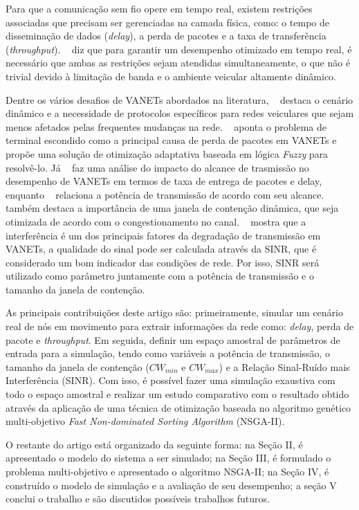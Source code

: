 \documentclass[conference]{IEEEtran}
\begin{document}
Para que a comunicação sem fio opere em tempo real, existem restrições associadas que precisam ser gerenciadas na camada física, como: o tempo de disseminação de dados (\textit{delay}), a perda de pacotes e a taxa de transferência (\textit{throughput}). ~\cite{Dai:2016} diz que para garantir um desempenho otimizado em tempo real, é necessário que ambas as restrições sejam atendidas simultaneamente, o que não é trivial devido à limitação de banda e o ambiente veicular altamente dinâmico.

Dentre os vários desafios de VANETs abordados na literatura, ~\cite{Cunha:2017} destaca o cenário dinâmico e a necessidade de protocolos específicos para redes veiculares que sejam menos afetados pelas frequentes mudanças na rede. ~\cite{Lim:2015} aponta o problema de terminal escondido como a principal causa de perda de pacotes em VANETs e propõe uma solução de otimização adaptativa baseada em lógica \textit{Fuzzy} para resolvê-lo. Já ~\cite{Almohammedi:2016} faz uma análise do impacto do alcance de trasmissão no desempenho de VANETs em termos de taxa de entrega de pacotes e delay, enquanto ~\cite{Rawat:2011} relaciona a potência de transmissão de acordo com seu alcance. ~\cite{Lim:2015} também destaca a importância de uma janela de contenção dinâmica, que seja otimizada de acordo com o congestionamento no canal. ~\cite{Schmidt:2009} mostra que a interferência é um dos principais fatores da degradação de transmissão em VANETs, a qualidade do sinal pode ser calculada através da SINR, que é considerado um bom indicador das condições de rede. Por isso, SINR será utilizado como parâmetro juntamente com a potência de transmissão e o tamanho da janela de contenção.

As principais contribuições deste artigo são: primeiramente, simular um cenário real de nós em movimento para extrair informações da rede como: \textit{delay}, perda de pacote e \textit{throughput}. Em seguida, definir um espaço amostral de parâmetros de entrada para a simulação, tendo como variáveis a potência de transmissão, o tamanho da janela de contenção ($CW_{min}$ e $CW_{max}$) e a Relação Sinal-Ruído mais Interferência (SINR). Com isso, é possível fazer uma simulação exaustiva com todo o espaço amostral e realizar um estudo comparativo com o resultado obtido através da aplicação de uma técnica de otimização baseada no algoritmo genético multi-objetivo \textit{Fast Non-dominated Sorting Algorithm} (NSGA-II).

O restante do artigo está organizado da seguinte forma: na Seção II, é apresentado o modelo do sistema a ser simulado; na Seção III, é formulado o problema multi-objetivo e apresentado o algoritmo NSGA-II; na Seção IV, é construído o modelo de simulação e a avaliação de seu desempenho; a seção V conclui o trabalho e são discutidos possíveis trabalhos futuros.
\end{document}
